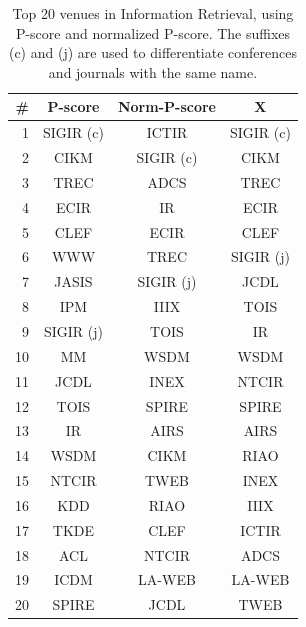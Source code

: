 \begin{table}[htbp]
\centering
\caption{Top 20 venues in Information Retrieval, using P-score and normalized P-score. The suffixes (c) and (j) are used to differentiate conferences and journals with the same name.}
\label{tab:ir-venues}
\begin{tabular}{rccc}
\toprule
\#		&	P-score		&	Norm-P-score&	X			\\ \hline
1		&	SIGIR (c)	&	ICTIR		&	SIGIR (c)	\\
2		&	CIKM		&	SIGIR (c)	&	CIKM		\\
3		&	TREC		&	ADCS		&	TREC		\\
4		&	ECIR		&	IR			&	ECIR		\\
5		&	CLEF		&	ECIR		&	CLEF		\\
6		&	WWW			&	TREC		&	SIGIR (j)	\\
7		&	JASIS		&	SIGIR (j)	&	JCDL		\\
8		&	IPM			&	IIIX		&	TOIS		\\
9		&	SIGIR (j)	&	TOIS		&	IR			\\
10		&	MM			&	WSDM		&	WSDM		\\
11		&	JCDL		&	INEX		&	NTCIR		\\
12		&	TOIS		&	SPIRE		&	SPIRE		\\
13		&	IR			&	AIRS		&	AIRS		\\
14		&	WSDM		&	CIKM		&	RIAO		\\
15		&	NTCIR		&	TWEB		&	INEX		\\
16		&	KDD			&	RIAO		&	IIIX		\\
17		&	TKDE		&	CLEF		&	ICTIR		\\
18		&	ACL			&	NTCIR		&	ADCS		\\
19		&	ICDM		&	LA-WEB		&	LA-WEB		\\
20		&	SPIRE		&	JCDL		&	TWEB		\\
\bottomrule


\end{tabular}
\end{table}

